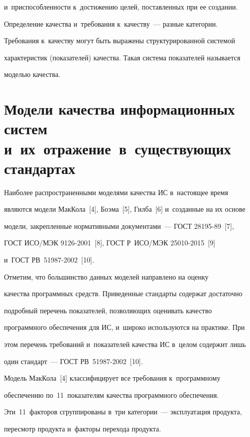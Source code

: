 и~приспособленности к~достижению целей, по\-став\-лен\-ных при ее создании.

     

     Определение качества и~требования к~качеству~--- разные категории. 

Требования к~качеству могут быть выражены структурированной сис\-те\-мой 

характеристик (показателей) качества. Такая сис\-те\-ма показателей называется 

моделью качества. 



\section{Модели качества информационных систем и~их~отражение~в~существующих стандартах}



     Наиболее распространенными моделями качества ИС в~на\-сто\-ящее время 

являются модели МакКола~[4], Боэма~[5], Гилба~[6] и~созданные на их основе 

модели, закрепленные нормативными документами~--- ГОСТ 28195-89~[7], 

ГОСТ ИСО\!/\!МЭК 9126-2001~[8], ГОСТ Р~ИСО\!/\!МЭК 25010-2015~[9] 

и~ГОСТ РВ~51987-2002~[10].

     

     Отметим, что большинство данных моделей направлено на оценку 

качества программных средств. Приведенные стандарты содержат достаточно 

подробный перечень показателей, позволяющих оценивать качество 

программного обеспечения для ИС, и~широко используются на практике. При 

этом перечень требований и~показателей качества ИС в~целом содержит лишь 

один стандарт~--- ГОСТ РВ~51987-2002~[10].

     

     Модель МакКола~[4] классифицирует все требования к~программному 

обеспечению по~11~показателям качества программного обеспечения. 

Эти~11~факторов сгруппированы в~три категории~--- эксплуатация продукта, 

пересмотр продукта и~факторы перехода продукта.

